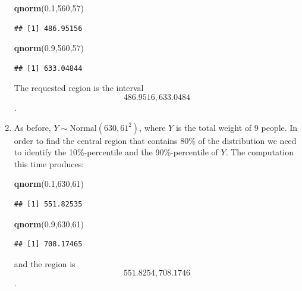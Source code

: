 \documentclass[]{krantz}
\makeatletter
\newenvironment{Shaded}{\begin{snugshade}}{\end{snugshade}}
\newcommand{\DecValTok}[1]{\textcolor[rgb]{0.00,0.00,0.81}{#1}}
\newcommand{\FloatTok}[1]{\textcolor[rgb]{0.00,0.00,0.81}{#1}}
\newcommand{\KeywordTok}[1]{\textcolor[rgb]{0.13,0.29,0.53}{\textbf{#1}}}
\newcommand{\NormalTok}[1]{#1}
\newenvironment{kframe}{%
\medskip{}
\setlength{\fboxsep}{.8em}
 \def\at@end@of@kframe{}%
 \ifinner\ifhmode%
  \def\at@end@of@kframe{\end{minipage}}%
  \begin{minipage}{\columnwidth}%
 \fi\fi%
 \def\FrameCommand##1{\hskip\@totalleftmargin \hskip-\fboxsep
 \colorbox{shadecolor}{##1}\hskip-\fboxsep
     \hskip-\linewidth \hskip-\@totalleftmargin \hskip\columnwidth}%
 \MakeFramed {\advance\hsize-\width
   \@totalleftmargin\z@ \linewidth\hsize
   \@setminipage}}%
 {\par\unskip\endMakeFramed%
 \at@end@of@kframe}
\renewenvironment{Shaded}{\begin{kframe}}{\end{kframe}}
\theoremstyle{definition}
\theoremstyle{definition}
\theoremstyle{definition}
\theoremstyle{remark}
\makeatother
\begin{document}
\begin{enumerate}
\begin{Shaded}
\begin{Highlighting}[]
\KeywordTok{qnorm}\NormalTok{(}\FloatTok{0.1}\NormalTok{,}\DecValTok{560}\NormalTok{,}\DecValTok{57}\NormalTok{)}
\end{Highlighting}
\end{Shaded}

\begin{verbatim}
## [1] 486.95156
\end{verbatim}

\begin{Shaded}
\begin{Highlighting}[]
\KeywordTok{qnorm}\NormalTok{(}\FloatTok{0.9}\NormalTok{,}\DecValTok{560}\NormalTok{,}\DecValTok{57}\NormalTok{)}
\end{Highlighting}
\end{Shaded}

\begin{verbatim}
## [1] 633.04844
\end{verbatim}

  The requested region is the interval \[486.9516, 633.0484\].
\item
  As before,
  \(Y \sim \mbox{Normal}(630, 61^2)\), where \(Y\) is the total weight of 9
  people. In order to find the central region that contains 80\% of the
  distribution we need to identify the 10\%-percentile and the
  90\%-percentile of \(Y\). The computation this time produces:

\begin{Shaded}
\begin{Highlighting}[]
\KeywordTok{qnorm}\NormalTok{(}\FloatTok{0.1}\NormalTok{,}\DecValTok{630}\NormalTok{,}\DecValTok{61}\NormalTok{)}
\end{Highlighting}
\end{Shaded}

\begin{verbatim}
## [1] 551.82535
\end{verbatim}

\begin{Shaded}
\begin{Highlighting}[]
\KeywordTok{qnorm}\NormalTok{(}\FloatTok{0.9}\NormalTok{,}\DecValTok{630}\NormalTok{,}\DecValTok{61}\NormalTok{)}
\end{Highlighting}
\end{Shaded}

\begin{verbatim}
## [1] 708.17465
\end{verbatim}

  and the region is \[551.8254, 708.1746\].
\end{enumerate}
\end{document}
